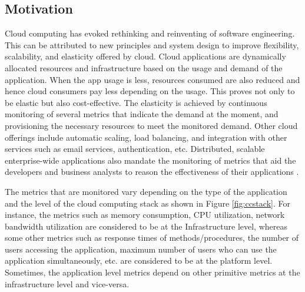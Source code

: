 \documentclass[article,type=msc,colorback,12pt,accentcolor=tud8b,table]{tudthesis}
\begin{document}
	
	\subsection{Motivation}
	
	Cloud computing has evoked rethinking and reinventing of software engineering. This can be attributed to new principles and system design to improve flexibility, scalability, and elasticity offered by cloud. Cloud applications are dynamically allocated resources and infrastructure based on the usage and demand of the application. When the app usage is less, resources consumed are also reduced and hence cloud consumers pay less depending on the usage. This proves not only to be elastic but also cost-effective. The elasticity is achieved by continuous monitoring of several metrics that indicate the demand at the moment, and provisioning the necessary resources to meet the monitored demand. Other cloud offerings include automatic scaling, load balancing, and integration with other services such as email services, authentication, etc. Distributed, scalable enterprise-wide applications also mandate the monitoring of metrics that aid the developers and business analysts to reason the effectiveness of their applications \cite{leitner2012application}.
	
	\par The metrics that are monitored vary depending on the type of the application and the level of the cloud computing stack as shown in Figure \ref{fig:ccstack}. For instance, the metrics such as memory consumption, CPU utilization, network bandwidth utilization are considered to be at the Infrastructure level, whereas some other metrics such as response times of methods/procedures, the number of users accessing the application, maximum number of users who can use the application simultaneously, etc. are considered to be at the platform level. Sometimes, the application level metrics depend on other primitive metrics at the infrastructure level and vice-versa.
	
\end{document}
